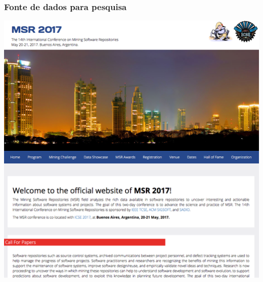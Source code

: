 \documentclass[xcolor=dvipsnames]{beamer}
\begin{document}
\begin{frame}
	\frametitle{Fonte de dados para pesquisa}
 	\includegraphics[scale=0.22]{msr.png}
\end{frame}


\section{}
\end{document}
